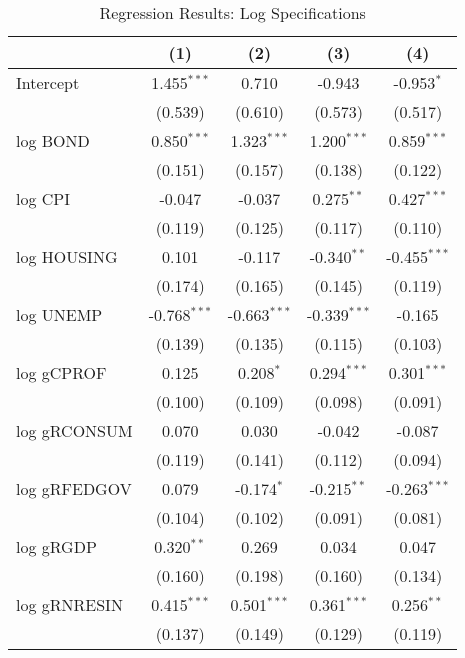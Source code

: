 \begin{table}[H]
\centering
\caption{Regression Results: Log Specifications}
\begin{tabular}{@{\extracolsep{5pt}}lcccc}
\hline
\hline
& (1) & (2) & (3) & (4) \\
\hline
Intercept & 1.455$^{***}$ & 0.710 & -0.943 & -0.953$^{*}$ \\
          & (0.539) & (0.610) & (0.573) & (0.517) \\

log BOND & 0.850$^{***}$ & 1.323$^{***}$ & 1.200$^{***}$ & 0.859$^{***}$ \\
               & (0.151) & (0.157) & (0.138) & (0.122) \\

log CPI & -0.047 & -0.037 & 0.275$^{**}$ & 0.427$^{***}$ \\
              & (0.119) & (0.125) & (0.117) & (0.110) \\

log HOUSING & 0.101 & -0.117 & -0.340$^{**}$ & -0.455$^{***}$ \\
                  & (0.174) & (0.165) & (0.145) & (0.119) \\

log UNEMP & -0.768$^{***}$ & -0.663$^{***}$ & -0.339$^{***}$ & -0.165 \\
                & (0.139) & (0.135) & (0.115) & (0.103) \\

log gCPROF & 0.125 & 0.208$^{*}$ & 0.294$^{***}$ & 0.301$^{***}$ \\
                 & (0.100) & (0.109) & (0.098) & (0.091) \\

log gRCONSUM & 0.070 & 0.030 & -0.042 & -0.087 \\
                   & (0.119) & (0.141) & (0.112) & (0.094) \\

log gRFEDGOV & 0.079 & -0.174$^{*}$ & -0.215$^{**}$ & -0.263$^{***}$ \\
                   & (0.104) & (0.102) & (0.091) & (0.081) \\

log gRGDP & 0.320$^{**}$ & 0.269 & 0.034 & 0.047 \\
                & (0.160) & (0.198) & (0.160) & (0.134) \\

log gRNRESIN & 0.415$^{***}$ & 0.501$^{***}$ & 0.361$^{***}$ & 0.256$^{**}$ \\
                   & (0.137) & (0.149) & (0.129) & (0.119) \\


\end{tabular}
\end{table}
